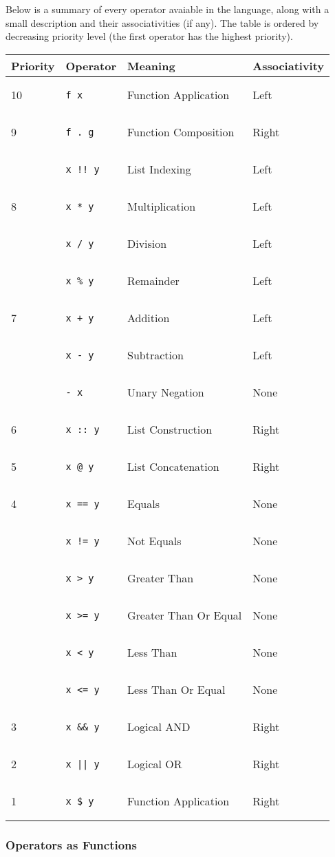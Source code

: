 \documentclass{article}
\def\code#1{\begin{footnotesize}\texttt{#1}\end{footnotesize}}
\begin{document}
Below is a summary of every operator avaiable in the language, along with a small description and their associativities (if any).
The table is ordered by decreasing priority level (the first operator has the highest priority).

\medskip

\begin{tabular}{|l|l|l|l|}
  \hline
  \textbf{Priority} & \textbf{Operator} & \textbf{Meaning} & \textbf{Associativity}\\
  \hline
  10 & \code{f x} & Function Application & Left\\
  \hline
  9 & \code{f . g} & Function Composition & Right\\
  \hline
   & \code{x !! y} & List Indexing & Left\\
  \hline
  8 & \code{x * y} & Multiplication & Left\\
  \hline
   & \code{x / y} & Division & Left\\
  \hline
   & \code{x \% y} & Remainder & Left\\
  \hline
  7 & \code{x + y} & Addition & Left\\
  \hline
   & \code{x - y} & Subtraction & Left\\
  \hline
   & \code{- x} & Unary Negation & None\\
  \hline
  6 & \code{x :: y} & List Construction & Right\\
  \hline
  5 & \code{x @ y} & List Concatenation & Right\\
  \hline
  4 & \code{x == y} & Equals & None\\
  \hline
   & \code{x != y} & Not Equals & None\\
  \hline
   & \code{x > y} & Greater Than & None\\
  \hline
   & \code{x >= y} & Greater Than Or Equal & None\\
  \hline
   & \code{x < y} & Less Than & None\\
  \hline
   & \code{x <= y} & Less Than Or Equal & None\\
  \hline
  3 & \code{x \&\& y} & Logical AND & Right\\
  \hline
  2 & \code{x || y} & Logical OR & Right\\
  \hline
  1 & \code{x \$ y} & Function Application & Right\\
  \hline
\end{tabular}

\subsubsection{Operators as Functions}
\end{document}
